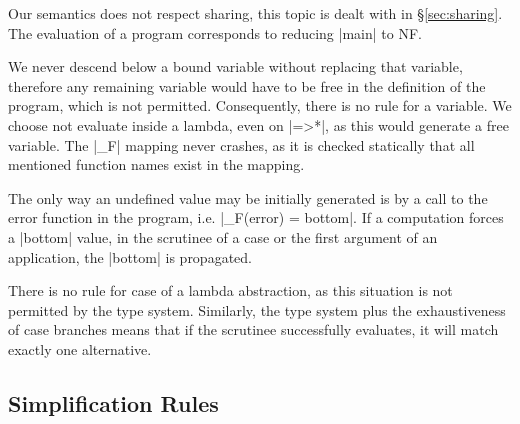 Our semantics does not respect sharing, this topic is dealt with in \S\ref{sec:sharing}. The evaluation of a program corresponds to reducing |main| to NF.

We never descend below a bound variable without replacing that variable, therefore any remaining variable would have to be free in the definition of the program, which is not permitted. Consequently, there is no rule for a variable. We choose not evaluate inside a lambda, even on |=>*|, as this would generate a free variable. The |_F| mapping never crashes, as it is checked statically that all mentioned function names exist in the mapping.

The only way an undefined value may be initially generated is by a call to the error function in the program, i.e. |_F(error) = bottom|. If a computation forces a |bottom| value, in the scrutinee of a case or the first argument of an application, the |bottom| is propagated.

There is no rule for case of a lambda abstraction, as this situation is not permitted by the type system. Similarly, the type system plus the exhaustiveness of case branches means that if the scrutinee successfully evaluates, it will match exactly one alternative.

\subsection{Simplification Rules}
\label{sec:core_simplify}

